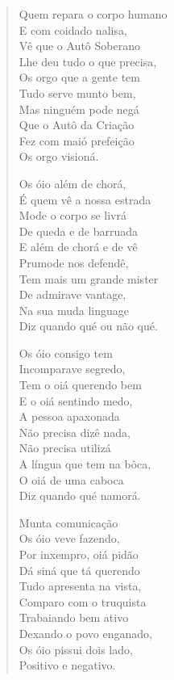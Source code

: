 \begin{verse}
Quem repara o corpo humano\\
E com coidado nalisa,\\
Vê que o Autô Soberano\\
Lhe deu tudo o que precisa,\\
Os orgo que a gente tem\\
Tudo serve munto bem,\\
Mas ninguém pode negá\\
Que o Autô da Criação\\
Fez com maió prefeição\\
Os orgo visioná.

Os óio além de chorá,\\
É quem vê a nossa estrada\\
Mode o corpo se livrá\\
De queda e de barruada\\
E além de chorá e de vê\\
Prumode nos defendê,\\
Tem mais um grande mister\\
De admirave vantage,\\
Na sua muda linguage\\
Diz quando qué ou não qué.

Os óio consigo tem\\
Incomparave segredo,\\
Tem o oiá querendo bem\\
E o oiá sentindo medo,\\
A pessoa apaxonada\\
Não precisa dizê nada,\\
Não precisa utilizá\\
A língua que tem na bôca,\\
O oiá de uma caboca\\
Diz quando qué namorá.

Munta comunicação\\
Os óio veve fazendo,\\
Por inxempro, oiá pidão\\
Dá siná que tá querendo\\
Tudo apresenta na vista,\\
Comparo com o truquista\\
Trabaiando bem ativo\\
Dexando o povo enganado,\\
Os óio pissui dois lado,\\
Positivo e negativo.


\end{verse}
